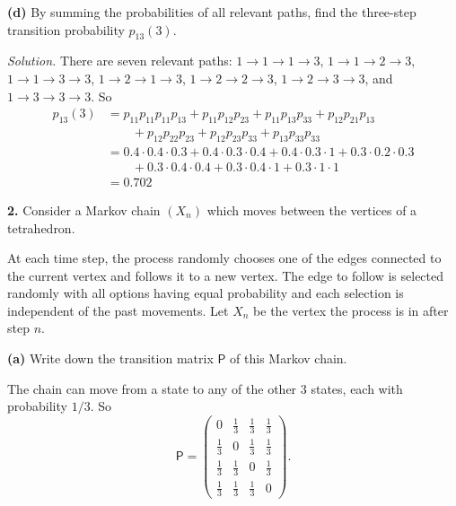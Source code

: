 \documentclass[
  a4paper,
]{article}
\theoremstyle{definition}
\theoremstyle{definition}
\theoremstyle{definition}
\theoremstyle{remark}
\begin{document}
\textbf{(d)} By summing the probabilities of all relevant paths, find the three-step transition probability \(p_{13}(3)\).

\begin{myanswers}

\emph{Solution.} There are seven relevant paths: \(1 \to 1 \to 1 \to 3\), \(1 \to 1 \to 2 \to 3\), \(1 \to 1 \to 3 \to 3\), \(1 \to 2 \to 1 \to 3\), \(1 \to 2 \to 2 \to 3\), \(1 \to 2 \to 3 \to 3\), and \(1 \to 3 \to 3 \to 3\). So
\begin{align*}
p_{13}(3) &= p_{11}p_{11}p_{11}p_{13} + p_{11}p_{12}p_{23} + p_{11}p_{13}p_{33}  + p_{12} p_{21} p_{13}\\
& \qquad{}+ p_{12}p_{22}p_{23} + p_{12}p_{23}p_{33} + p_{13}p_{33}p_{33}\\
& = 0.4 \cdot 0.4 \cdot 0.3 + 0.4\cdot 0.3\cdot 0.4 + 0.4\cdot 0.3 \cdot 1 + 0.3 \cdot 0.2 \cdot 0.3 \\
& \qquad{}+ 0.3\cdot 0.4 \cdot 0.4 + 0.3 \cdot 0.4 \cdot 1 + 0.3 \cdot 1 \cdot 1\\
&= 0.702
\end{align*}

\end{myanswers}

\textbf{2.} Consider a Markov chain \((X_n)\) which moves between the vertices of
a tetrahedron.

At each time step, the process randomly chooses one of the edges connected to the current vertex and follows it to a new vertex. The edge to follow is selected randomly with all options having equal probability and each selection is independent of the past movements. Let \(X_n\) be the vertex the process is in after step \(n\).

\textbf{(a)} Write down the transition matrix \(\mathsf P\) of this Markov chain.

\begin{myanswers}

The chain can move from a state to any of the other \(3\) states, each with probability \(1/3\). So
\[ \mathsf P = \begin{pmatrix} 0 & \frac13 & \frac13 & \frac13 \\
                               \frac13 & 0 & \frac13 & \frac13 \\
                               \frac13 & \frac13 & 0 & \frac13 \\
                               \frac13 & \frac13 & \frac13 & 0 \end{pmatrix} . \]

\end{myanswers}
\end{document}
